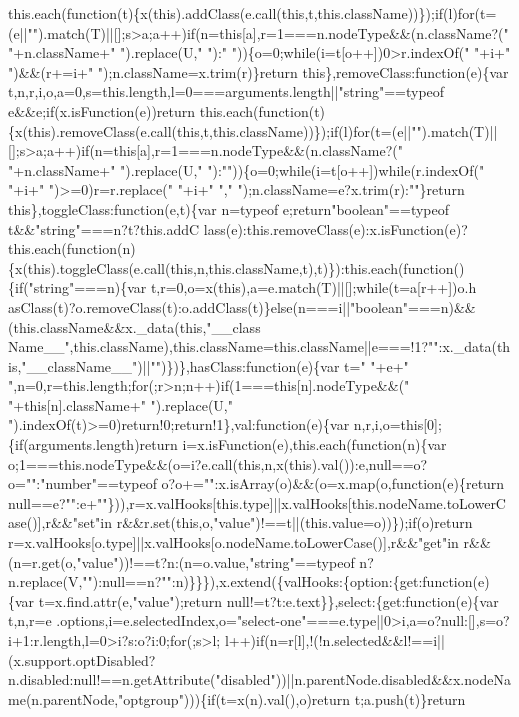 \begin{DoxyCode}
{       this.each(function(t)\{x(this).addClass(e.call(this,t,this.className))\});if(l)for(t=(e||"").match(T)||[];s>a;a++)if(n=this[a],r=1===n.nodeType&&(n.className?(" "+n.className+"
       ").replace(U," "):" "))\{o=0;while(i=t[o++])0>r.indexOf(" "+i+" ")&&(r+=i+" ");n.className=x.trim(r)\}return
       this\},removeClass:function(e)\{var t,n,r,i,o,a=0,s=this.length,l=0===arguments.length||"string"==typeof
       e&&e;if(x.isFunction(e))return
       this.each(function(t)\{x(this).removeClass(e.call(this,t,this.className))\});if(l)for(t=(e||"").match(T)||[];s>a;a++)if(n=this[a],r=1===n.nodeType&&(n.className?(" "+n.className+" ").replace(U,"
       "):""))\{o=0;while(i=t[o++])while(r.indexOf(" "+i+" ")>=0)r=r.replace(" "+i+" ","
       ");n.className=e?x.trim(r):""\}return this\},toggleClass:function(e,t)\{var n=typeof e;return"boolean"==typeof
       t&&"string"===n?t?this.addC
      lass(e):this.removeClass(e):x.isFunction(e)?this.each(function(n)\{x(this).toggleClass(e.call(this,n,this.className,t),t)\}):this.each(function()\{if("string"===n)\{var
       t,r=0,o=x(this),a=e.match(T)||[];while(t=a[r++])o.h
      asClass(t)?o.removeClass(t):o.addClass(t)\}else(n===i||"boolean"===n)&&(this.className&&x.\_data(this,"\_\_class
      Name\_\_",this.className),this.className=this.className||e===!1?"":x.\_data(this,"\_\_className\_\_")||"")\})\},hasClass:function(e)\{var t=" "+e+" ",n=0,r=this.length;for(;r>n;n++)if(1===this[n].nodeType&&("
       "+this[n].className+" ").replace(U," ").indexOf(t)>=0)return!0;return!1\},val:function(e)\{var
       n,r,i,o=this[0];\{if(arguments.length)return i=x.isFunction(e),this.each(function(n)\{var
       o;1===this.nodeType&&(o=i?e.call(this,n,x(this).val()):e,null==o?o="":"number"==typeof o?o+="":x.isArray(o)&&(o=x.map(o,function(e)\{return
       null==e?"":e+""\})),r=x.valHooks[this.type]||x.valHooks[this.nodeName.toLowerCase()],r&&"set"in
       r&&r.set(this,o,"value")!==t||(this.value=o))\});if(o)return r=x.valHooks[o.type]||x.valHooks[o.nodeName.toLowerCase()],r&&"get"in
       r&&(n=r.get(o,"value"))!==t?n:(n=o.value,"string"==typeof
       n?n.replace(V,""):null==n?"":n)\}\}\}),x.extend(\{valHooks:\{option:\{get:function(e)\{var t=x.find.attr(e,"value");return null!=t?t:e.text\}\},select:\{get:function(e)\{var
       t,n,r=e
      .options,i=e.selectedIndex,o="select-one"===e.type||0>i,a=o?null:[],s=o?i+1:r.length,l=0>i?s:o?i:0;for(;s>l;
      l++)if(n=r[l],!(!n.selected&&l!==i||(x.support.optDisabled?n.disabled:null!==n.getAttribute("disabled"))||n.parentNode.disabled&&x.nodeName(n.parentNode,"optgroup")))\{if(t=x(n).val(),o)return t;a.push(t)\}return
}
\end{DoxyCode}
